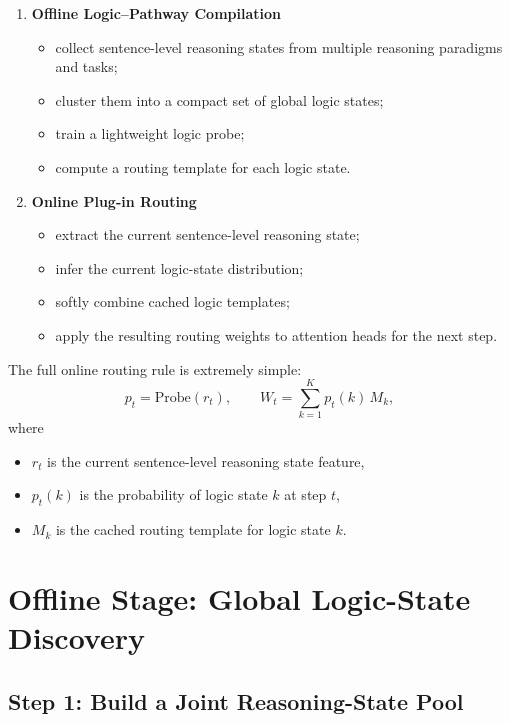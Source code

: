 \documentclass[11pt]{article}
\begin{document}
\begin{enumerate}[leftmargin=1.5em]
    \item \textbf{Offline Logic--Pathway Compilation}
    \begin{itemize}[leftmargin=1.5em]
        \item collect sentence-level reasoning states from multiple reasoning paradigms and tasks;
        \item cluster them into a compact set of global logic states;
        \item train a lightweight logic probe;
        \item compute a routing template for each logic state.
    \end{itemize}
    
    \item \textbf{Online Plug-in Routing}
    \begin{itemize}[leftmargin=1.5em]
        \item extract the current sentence-level reasoning state;
        \item infer the current logic-state distribution;
        \item softly combine cached logic templates;
        \item apply the resulting routing weights to attention heads for the next step.
    \end{itemize}
\end{enumerate}

The full online routing rule is extremely simple:
\[
p_t = \mathrm{Probe}(r_t), \qquad
W_t = \sum_{k=1}^{K} p_t(k)\, M_k,
\]
where
\begin{itemize}[leftmargin=1.5em]
    \item $r_t$ is the current sentence-level reasoning state feature,
    \item $p_t(k)$ is the probability of logic state $k$ at step $t$,
    \item $M_k$ is the cached routing template for logic state $k$.
\end{itemize}

\section{Offline Stage: Global Logic-State Discovery}

\subsection{Step 1: Build a Joint Reasoning-State Pool}
\end{document}
